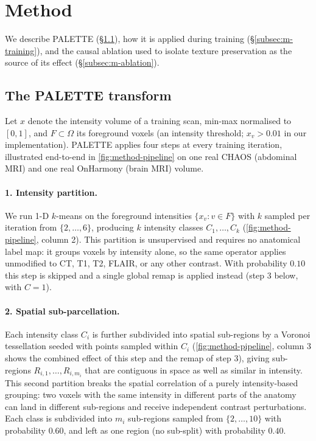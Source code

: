 \section{Method}
\label{sec:method}

We describe PALETTE (\S\ref{subsec:m-transform}), how it is applied during
training (\S\ref{subsec:m-training}), and the causal ablation used to
isolate texture preservation as the source of its effect
(\S\ref{subsec:m-ablation}).

\subsection{The PALETTE transform}
\label{subsec:m-transform}

Let $x$ denote the intensity volume of a training scan, min-max normalised
to $[0,1]$, and $F \subset \Omega$ its foreground voxels (an intensity
threshold; $x_v > 0.01$ in our implementation). PALETTE applies four steps
at every training iteration, illustrated end-to-end in
\cref{fig:method-pipeline} on one real CHAOS (abdominal MRI) and one real
OnHarmony (brain MRI) volume.

\paragraph{1. Intensity partition.} We run 1-D $k$-means on the foreground
intensities $\{x_v : v \in F\}$ with $k$ sampled per iteration from
$\{2,\dots,6\}$, producing $k$ intensity classes $C_1, \dots, C_k$
(\cref{fig:method-pipeline}, column 2). This partition is unsupervised and
requires no anatomical label map: it groups voxels by intensity alone, so
the same operator applies unmodified to CT, T1, T2, FLAIR, or any other
contrast. With probability $0.10$ this step is skipped and a single global
remap is applied instead (step 3 below, with $C=1$).

\paragraph{2. Spatial sub-parcellation.} Each intensity class $C_i$ is
further subdivided into spatial sub-regions by a Voronoi tessellation
seeded with points sampled within $C_i$ (\cref{fig:method-pipeline}, column
3 shows the combined effect of this step and the remap of step 3), giving
sub-regions $R_{i,1}, \dots, R_{i,m_i}$ that are contiguous in space as
well as similar in intensity. This second partition breaks the spatial
correlation of a purely intensity-based grouping: two voxels with the same
intensity in different parts of the anatomy can land in different
sub-regions and receive independent contrast perturbations. Each class is
subdivided into $m_i$ sub-regions sampled from $\{2,\dots,10\}$ with
probability $0.60$, and left as one region (no sub-split) with probability
$0.40$.

